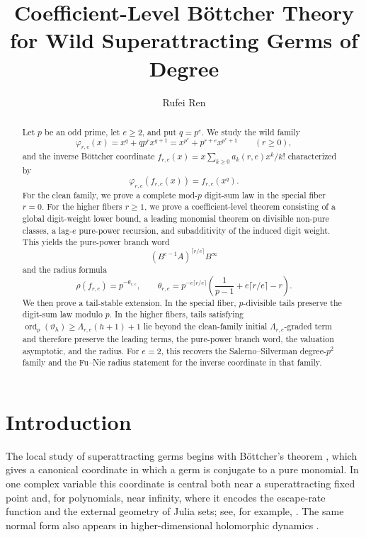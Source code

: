 \documentclass[11pt]{amsart}
\title{Coefficient-Level B\"ottcher Theory for Wild Superattracting Germs of Degree \NoCaseChange{\texorpdfstring{$p^e$}{pe}}}
\author{Rufei Ren}
\numberwithin{equation}{section}
\DeclareMathOperator{\ordop}{ord}
\newcommand{\vp}{\ordop_p}
\begin{document}
\begin{abstract}
Let $p$ be an odd prime, let $e\ge2$, and put $q=p^e$.  We study the wild family
\[
\varphi_{r,e}(x)=x^q+qp^r x^{q+1}=x^{p^e}+p^{r+e}x^{p^e+1}
\qquad (r\ge0),
\]
and the inverse B\"ottcher coordinate $f_{r,e}(x)=x\sum_{k\ge0}a_k(r,e)x^k/k!$ characterized by
\[
\varphi_{r,e}(f_{r,e}(x))=f_{r,e}(x^q).
\]
For the clean family, we prove a complete mod-$p$ digit-sum law in the special fiber $r=0$.  For the higher fibers $r\ge1$, we prove a coefficient-level theorem consisting of a global digit-weight lower bound, a leading monomial theorem on divisible non-pure classes, a lag-$e$ pure-power recursion, and subadditivity of the induced digit weight.  This yields the pure-power branch word
\[
(B^{e-1}A)^{\lceil r/e\rceil}B^\infty
\]
and the radius formula
\[
\rho(f_{r,e})=p^{-\theta_{r,e}},\qquad \theta_{r,e}=p^{-e\lceil r/e\rceil}\left(\frac{1}{p-1}+e\lceil r/e\rceil-r\right).
\]
We then prove a tail-stable extension.  In the special fiber, $p$-divisible tails preserve the digit-sum law modulo $p$.  In the higher fibers, tails satisfying $\vp(\vartheta_h)\ge\Lambda_{r,e}(h+1)+1$ lie beyond the clean-family initial $\Lambda_{r,e}$-graded term and therefore preserve the leading terms, the pure-power branch word, the valuation asymptotic, and the radius.  For $e=2$, this recovers the Salerno--Silverman degree-$p^2$ family and the Fu--Nie radius statement for the inverse coordinate in that family.
\end{abstract}

\maketitle
\tableofcontents

\section{Introduction}
The local study of superattracting germs begins with B\"ottcher's theorem \cite{Bottcher1904}, which gives a canonical coordinate in which a germ is conjugate to a pure monomial.  In one complex variable this coordinate is central both near a superattracting fixed point and, for polynomials, near infinity, where it encodes the escape-rate function and the external geometry of Julia sets; see, for example, \cite{AlexanderIavernaroRosa,DouadyHubbard1,DouadyHubbard2,Milnor,Ritt}.  The same normal form also appears in higher-dimensional holomorphic dynamics \cite{BuffEpsteinKoch, HubbardPapadopol}.
\end{document}
